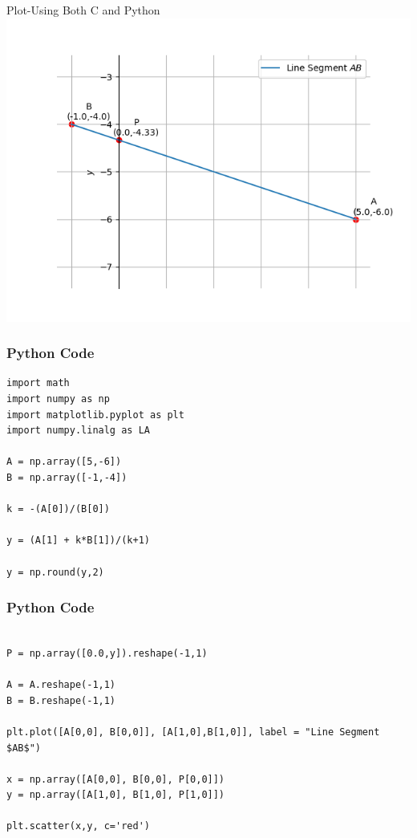 \documentclass{beamer}
\begin{document}
\begin{frame}{Plot-Using Both C and Python}
    \centering
    \includegraphics[width=\columnwidth, height=0.8\textheight, keepaspectratio]{Figs/plot(py+C).png}     
\end{frame}



\begin{frame}[fragile]
    \frametitle{Python Code}
    \begin{lstlisting}
import math
import numpy as np
import matplotlib.pyplot as plt
import numpy.linalg as LA

A = np.array([5,-6])
B = np.array([-1,-4])

k = -(A[0])/(B[0])

y = (A[1] + k*B[1])/(k+1)

y = np.round(y,2)

\end{lstlisting}
\end{frame}

\begin{frame}[fragile]
    \frametitle{Python Code}
    \begin{lstlisting}

P = np.array([0.0,y]).reshape(-1,1)

A = A.reshape(-1,1)
B = B.reshape(-1,1)

plt.plot([A[0,0], B[0,0]], [A[1,0],B[1,0]], label = "Line Segment $AB$")

x = np.array([A[0,0], B[0,0], P[0,0]])
y = np.array([A[1,0], B[1,0], P[1,0]])

plt.scatter(x,y, c='red')



\end{lstlisting}
\end{frame}
\end{document}
